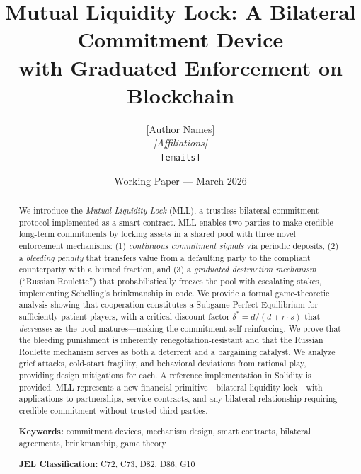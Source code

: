 \documentclass[12pt,a4paper]{article}
\title{Mutual Liquidity Lock: A Bilateral Commitment Device \\
  with Graduated Enforcement on Blockchain}
\author{
  [Author Names] \\
  \textit{[Affiliations]} \\
  \texttt{[emails]}
}
\date{Working Paper --- March 2026}
\begin{document}
\maketitle


\begin{abstract}
We introduce the \textit{Mutual Liquidity Lock} (MLL), a trustless bilateral commitment protocol implemented as a smart contract. MLL enables two parties to make credible long-term commitments by locking assets in a shared pool with three novel enforcement mechanisms: (1) \textit{continuous commitment signals} via periodic deposits, (2) a \textit{bleeding penalty} that transfers value from a defaulting party to the compliant counterparty with a burned fraction, and (3) a \textit{graduated destruction mechanism} (``Russian Roulette'') that probabilistically freezes the pool with escalating stakes, implementing Schelling's brinkmanship in code. We provide a formal game-theoretic analysis showing that cooperation constitutes a Subgame Perfect Equilibrium for sufficiently patient players, with a critical discount factor $\delta^* = d/(d + r \cdot s)$ that \textit{decreases} as the pool matures---making the commitment self-reinforcing. We prove that the bleeding punishment is inherently renegotiation-resistant and that the Russian Roulette mechanism serves as both a deterrent and a bargaining catalyst. We analyze grief attacks, cold-start fragility, and behavioral deviations from rational play, providing design mitigations for each. A reference implementation in Solidity is provided. MLL represents a new financial primitive---bilateral liquidity lock---with applications to partnerships, service contracts, and any bilateral relationship requiring credible commitment without trusted third parties.

\medskip
\noindent\textbf{Keywords:} commitment devices, mechanism design, smart contracts, bilateral agreements, brinkmanship, game theory

\medskip
\noindent\textbf{JEL Classification:} C72, C73, D82, D86, G10
\end{abstract}

\newpage
\tableofcontents
\newpage

\end{document}
